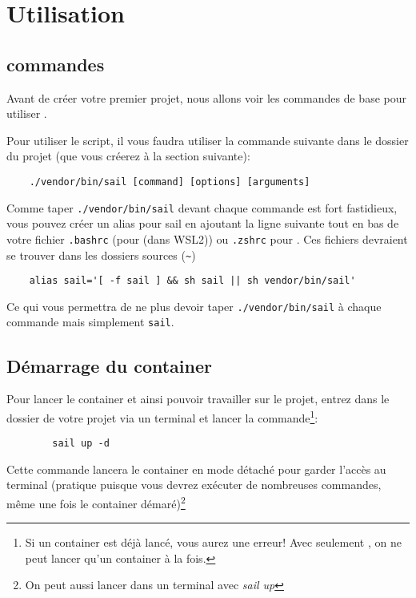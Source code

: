 \section[Utilisation]{Utilisation\label{sec:utilisation}}

\subsection[Commandes]{commandes}
Avant de créer votre premier projet, nous allons voir les commandes de base pour utiliser \laravelsail{}.

Pour utiliser le script, il vous faudra utiliser la commande suivante dans le dossier du projet (que vous créerez à la section suivante):

\begin{lstlisting}
    ./vendor/bin/sail [command] [options] [arguments]
\end{lstlisting}

Comme taper \verb|./vendor/bin/sail| devant chaque commande est fort fastidieux, vous pouvez créer un alias pour sail en ajoutant la ligne suivante tout en bas de votre fichier \verb|.bashrc| (pour \windows{} (dans WSL2)) ou \verb|.zshrc| pour \macos{}. Ces fichiers devraient se trouver dans les dossiers sources (\verb|~|)

\begin{lstlisting}
    alias sail='[ -f sail ] && sh sail || sh vendor/bin/sail'
\end{lstlisting}

Ce qui vous permettra de ne plus devoir taper \verb|./vendor/bin/sail| à chaque commande mais simplement \verb|sail|.

\subsection[Démarrage du container]{Démarrage du container}
    Pour lancer le container et ainsi pouvoir travailler sur le projet, entrez dans le dossier de votre projet via un terminal et lancer la commande\footnote{Si un container est déjà lancé, vous aurez une erreur! Avec seulement \laravelsail, on ne peut lancer qu'un container à la fois.}:
    
    \begin{lstlisting}
        sail up -d
    \end{lstlisting}

    Cette commande lancera le container en mode détaché pour garder l'accès au terminal (pratique puisque vous devrez exécuter de nombreuses commandes, même une fois le container démaré)\footnote{On peut aussi lancer dans un terminal avec \textit{sail up}}

